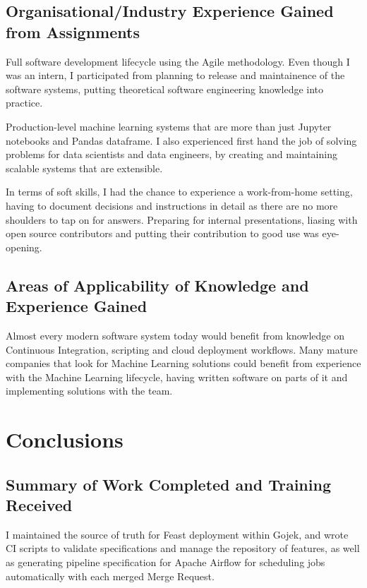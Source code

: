 \documentclass[a4paper, 12pt, fleqn]{report}
\begin{document}
\section{Organisational/Industry Experience Gained from Assignments}
Full software development lifecycle using the Agile methodology. Even though I
was an intern, I participated from planning to release and maintainence of the
software systems, putting theoretical software engineering knowledge into
practice.

Production-level machine learning systems that are more than just Jupyter
notebooks and Pandas dataframe. I also experienced first hand the job of
solving problems for data scientists and data engineers, by creating and
maintaining scalable systems that are extensible.

In terms of soft skills, I had the chance to experience a work-from-home
setting, having to document decisions and instructions in detail as there are no
more shoulders to tap on for answers. Preparing for internal presentations,
liasing with open source contributors and putting their contribution to good use
was eye-opening.

\section{Areas of Applicability of Knowledge and Experience Gained}
Almost every modern software system today would benefit from knowledge on Continuous
Integration, scripting and cloud deployment workflows. Many mature companies
that look for Machine Learning solutions could benefit from experience with the
Machine Learning lifecycle, having written software on parts of it and
implementing solutions with the team.

\chapter{Conclusions}

\section{Summary of Work Completed and Training Received}
I maintained the source of truth for Feast deployment within Gojek, and wrote CI scripts to
validate specifications and manage the repository of features, as well as
generating pipeline specification for Apache Airflow for scheduling jobs
automatically with each merged Merge Request.
\newline
\end{document}
